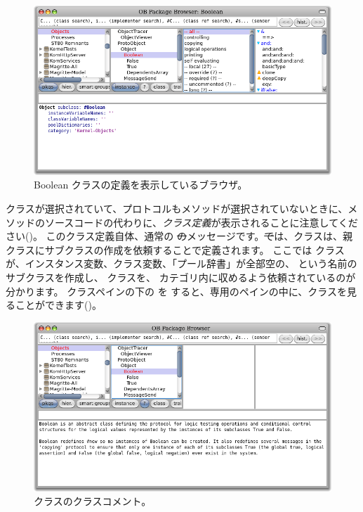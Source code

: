 \documentclass[a4paper,10pt,twoside]{book}
\begin{document}

\begin{figure}[hbt]
\centerline {\includegraphics[width=\textwidth]{Kernel-objects-boolean}}
\caption{Boolean クラスの定義を表示しているブラウザ。
}
\end{figure}

 クラスが選択されていて、プロトコルもメソッドが選択されていないときに、メソッドのソースコードの代わりに、\emph{クラス定義}が表示されることに注意してください()。
このクラス定義自体、通常の \st のメッセージです。\st では、クラスは、親クラスにサブクラスの作成を依頼することで定義されます。
ここでは  クラスが、インスタンス変数、クラス変数、「プール辞書」が全部空の、 という名前のサブクラスを作成し、 クラスを、 カテゴリ内に収めるよう依頼されているのが分かります。
クラスペインの下の  を \click すると、専用のペインの中に、クラスを見ることができます()。

\begin{figure}[hbt]
\centerline {\includegraphics[width=\textwidth]{classComment}}
\caption{ クラスのクラスコメント。
}
\end{figure}
\end{document}
